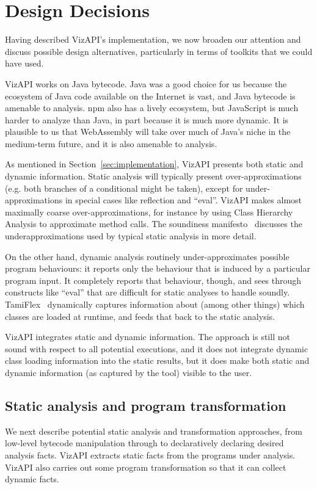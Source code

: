 \section{Design Decisions}
\label{sec:design-decisions}

Having described VizAPI's implementation, we now broaden our attention
and discuss possible design alternatives, particularly in terms of toolkits
that we could have used.

VizAPI works on Java bytecode. Java was a good choice for us
because the ecosystem of Java code available on the
Internet is vast, and Java bytecode is amenable to analysis. 
npm also has a lively ecosystem, but JavaScript is much harder to
analyze than Java, in part because it is much more dynamic. It is plausible
to us that WebAssembly will take over much of Java's niche in the medium-term
future, and it is also amenable to analysis.

As mentioned in Section~\ref{sec:implementation}, VizAPI presents both
static and dynamic information. Static analysis will typically present
over-approximations (e.g. both branches of a conditional might be
taken), except for under-approximations in special cases like
reflection and ``eval''. VizAPI makes almost maximally coarse
over-approximations, for instance by using Class Hierarchy Analysis to
approximate method calls. The soundiness
manifesto~\cite{livshits15:_in_defen_sound} discusses the
underapproximations used by typical static analysis in more detail.

On the other hand, dynamic analysis routinely under-approximates possible
program behaviours: it reports only the behaviour that is induced by
a particular program input. It completely reports that behaviour, though,
and sees through constructs like ``eval'' that are difficult for static analyses to
handle soundly. TamiFlex~\cite{bodden11:_tamin_reflec} dynamically captures
information about (among other things) which classes are loaded at runtime,
and feeds that back to the static analysis.

VizAPI integrates static and dynamic information. The approach is
still not sound with respect to all potential executions, and it does
not integrate dynamic class loading information into the static
results, but it does make both static and dynamic information (as 
captured by the tool) visible to the user.

\subsection{Static analysis and program transformation}
We next describe potential static analysis and transformation
approaches, from low-level bytecode manipulation through to
declaratively declaring desired analysis facts. VizAPI extracts static
facts from the programs under analysis. VizAPI also carries out some
program transformation so that it can collect dynamic facts.

